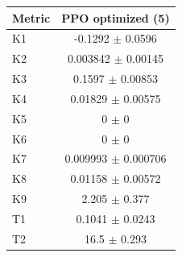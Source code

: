 \begin{tabular}{lc}
\toprule
Metric & PPO optimized (5) \\
\midrule
K1 & -0.1292 $\pm$ 0.0596 \\
K2 & 0.003842 $\pm$ 0.00145 \\
K3 & 0.1597 $\pm$ 0.00853 \\
K4 & 0.01829 $\pm$ 0.00575 \\
K5 & 0 $\pm$ 0 \\
K6 & 0 $\pm$ 0 \\
K7 & 0.009993 $\pm$ 0.000706 \\
K8 & 0.01158 $\pm$ 0.00572 \\
K9 & 2.205 $\pm$ 0.377 \\
T1 & 0.1041 $\pm$ 0.0243 \\
T2 & 16.5 $\pm$ 0.293 \\
\bottomrule
\end{tabular}
